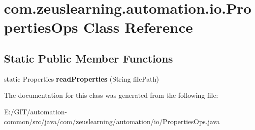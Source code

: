 \hypertarget{classcom_1_1zeuslearning_1_1automation_1_1io_1_1PropertiesOps}{}\section{com.\+zeuslearning.\+automation.\+io.\+Properties\+Ops Class Reference}
\label{classcom_1_1zeuslearning_1_1automation_1_1io_1_1PropertiesOps}
\subsection*{Static Public Member Functions}
\begin{DoxyCompactItemize}
\item 
\hypertarget{classcom_1_1zeuslearning_1_1automation_1_1io_1_1PropertiesOps_ab7062c1f0c07596956a50e07ec9482dc}{}\label{classcom_1_1zeuslearning_1_1automation_1_1io_1_1PropertiesOps_ab7062c1f0c07596956a50e07ec9482dc} 
static Properties {\bfseries read\+Properties} (String file\+Path)
\end{DoxyCompactItemize}


The documentation for this class was generated from the following file\+:\begin{DoxyCompactItemize}
\item 
E\+:/\+G\+I\+T/automation-\/common/src/java/com/zeuslearning/automation/io/Properties\+Ops.\+java\end{DoxyCompactItemize}
